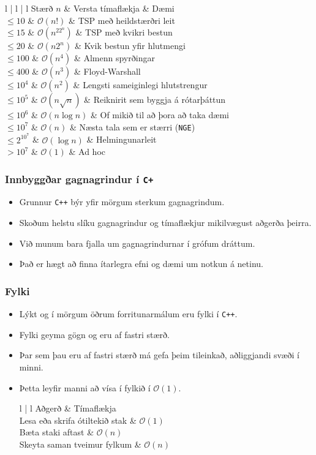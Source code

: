 \documentclass{beamer}
\newcommand\env[2]
{
	\begin{#1}
	#2
	\end{#1}
}
\begin{document}
\env{frame}
{
	\env{tabular}
	{
		{l | l | l}
		Stærð $n$ & Versta tímaflækja & Dæmi\\
		\hline
		$\leq 10$ & $\mathcal{O}(n!)$ & TSP með heildstærðri leit\\
		$\leq 15$ & $\mathcal{O}(n^22^n)$ & TSP með kvikri bestun\\
		$\leq 20$ & $\mathcal{O}(n2^n)$ & Kvik bestun yfir hlutmengi\\
		$\leq 100$ & $\mathcal{O}(n^4)$ & Almenn spyrðingar\\
		$\leq 400$ & $\mathcal{O}(n^3)$ & Floyd-Warshall\\
		$\leq 10^4$ & $\mathcal{O}(n^2)$ & Lengsti sameiginlegi hlutstrengur\\
		$\leq 10^5$ & $\mathcal{O}(n \sqrt{n})$ & Reiknirit sem byggja á rótarþáttun\\
		$\leq 10^6$ & $\mathcal{O}(n \log n)$ & Of mikið til að þora að taka dæmi\\
		$\leq 10^7$ & $\mathcal{O}(n)$ & Næsta tala sem er stærri (\texttt{NGE})\\
		$\leq 2^{10^7}$ & $\mathcal{O}(\log n)$ & Helmingunarleit\\
		$> 10^7$ & $\mathcal{O}(1)$ & Ad hoc
	}
}

\env{frame}
{
	\frametitle{Innbyggðar gagnagrindur í \texttt{C+}}
	\env{itemize}
	{
		\item<1-> Grunnur \texttt{C++} býr yfir mörgum sterkum gagnagrindum.
		\item<2-> Skoðum helstu slíku gagnagrindur og tímaflækjur mikilvægust aðgerða þeirra.
		\item<3-> Við munum bara fjalla um gagnagrindurnar í grófum dráttum.
		\item<4-> Það er hægt að finna ítarlegra efni og dæmi um notkun á netinu.
	}
}

\env{frame}
{
	\frametitle{Fylki}
	\env{itemize}
	{
		\item<1-> Lýkt og í mörgum öðrum forritunarmálum eru fylki í \texttt{C++}.
		\item<2-> Fylki geyma gögn og eru af fastri stærð.
		\item<3-> Þar sem þau eru af fastri stærð má gefa þeim tileinkað, aðliggjandi svæði í minni.
		\item<4-> Þetta leyfir manni að vísa í fylkið í $\mathcal{O}(1)$.
		\env{tabular}
		{
			{l | l}
			Aðgerð & Tímaflækja\\
			\hline
			Lesa eða skrifa ótiltekið stak & $\mathcal{O}(1)$\\
			Bæta staki aftast & $\mathcal{O}(n)$\\
			Skeyta saman tveimur fylkum & $\mathcal{O}(n)$\\
		}
	}
}
\end{document}
